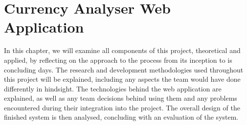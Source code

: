 \chapter{Currency Analyser Web Application}\label{applprojch}
In this chapter, we will examine all components of this project, theoretical and applied, by reflecting on the approach to the process from its inception to is concluding days. The research and development methodologies used throughout this project will be explained, including any aspects the team would have done differently in hindsight. The technologies behind the web application are explained, as well as any team decisions behind using them and any problems encountered during their integration into the project. The overall design of the finished system is then analysed, concluding with an evaluation of the system.











